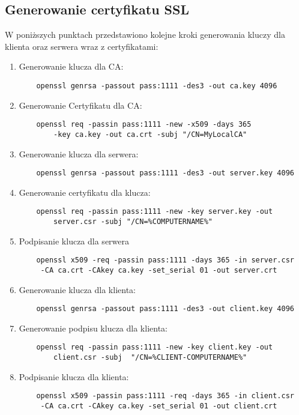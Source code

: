 \subsection{Generowanie certyfikatu SSL}
 W poniższych punktach przedstawiono kolejne kroki generowania kluczy dla klienta oraz serwera wraz z certyfikatami:
\begin{enumerate}
\item Generowanie klucza dla CA:
\begin{lstlisting}
    openssl genrsa -passout pass:1111 -des3 -out ca.key 4096
\end{lstlisting}
\item Generowanie Certyfikatu dla CA:
\begin{lstlisting}
    openssl req -passin pass:1111 -new -x509 -days 365
        -key ca.key -out ca.crt -subj "/CN=MyLocalCA"
\end{lstlisting}
\item Generowanie klucza dla serwera:
\begin{lstlisting}
    openssl genrsa -passout pass:1111 -des3 -out server.key 4096
\end{lstlisting}
\item Generowanie certyfikatu dla klucza:
\begin{lstlisting}
    openssl req -passin pass:1111 -new -key server.key -out
        server.csr -subj "/CN=%COMPUTERNAME%"
\end{lstlisting}
\item Podpisanie klucza dla serwera
\begin{lstlisting}
    openssl x509 -req -passin pass:1111 -days 365 -in server.csr
     -CA ca.crt -CAkey ca.key -set_serial 01 -out server.crt
\end{lstlisting}
\item Generowanie klucza dla klienta:
\begin{lstlisting}
    openssl genrsa -passout pass:1111 -des3 -out client.key 4096
\end{lstlisting}
\item Generowanie podpisu klucza dla klienta:
\begin{lstlisting}
    openssl req -passin pass:1111 -new -key client.key -out
        client.csr -subj  "/CN=%CLIENT-COMPUTERNAME%"
\end{lstlisting}
\item Podpisanie klucza dla klienta:
\begin{lstlisting}
    openssl x509 -passin pass:1111 -req -days 365 -in client.csr
     -CA ca.crt -CAkey ca.key -set_serial 01 -out client.crt
\end{lstlisting}
\end{enumerate}
